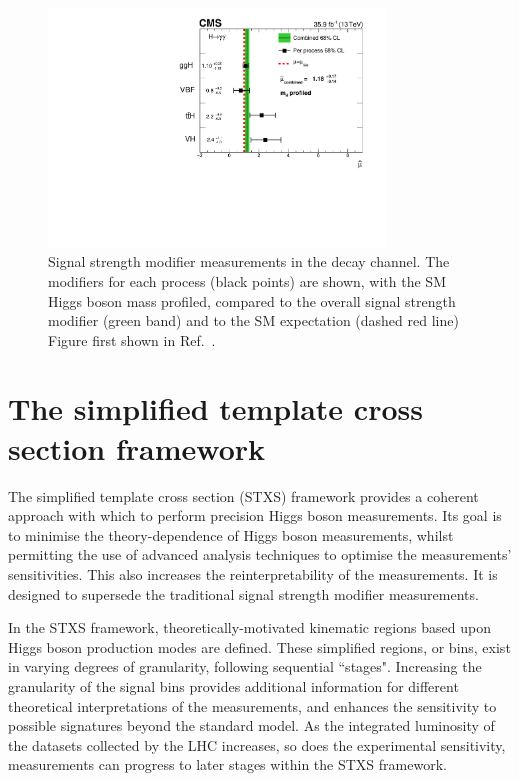 \begin{figure}[hptb]
  \centering
  \includegraphics[width=0.8\textwidth]{Figures/Theory/PerProcTrad.pdf}
  \caption[Per process signal strength modifier measurements from Ref.~\cite{HIG-16-040}.]
  {
    Signal strength modifier measurements in the \Hgg decay channel.
    The modifiers for each process (black points) are shown, with the SM Higgs boson mass profiled, 
    compared to the overall signal strength modifier (green band) 
    and to the SM expectation (dashed red line)
    Figure first shown in Ref.~\cite{HIG-16-040}.
  }
  \label{fig:theory_PerProcTrad}
\end{figure}

\section{The simplified template cross section framework}

The simplified template cross section (STXS) framework \cite{YR4}
provides a coherent approach with which to perform precision Higgs boson measurements. 
Its goal is to minimise the theory-dependence of Higgs boson measurements, 
whilst permitting the use of advanced analysis techniques to optimise the measurements' sensitivities.
This also increases the reinterpretability of the measurements.
It is designed to supersede the traditional signal strength modifier measurements.

In the STXS framework, 
theoretically-motivated kinematic regions based upon Higgs boson production modes are defined.
These simplified regions, or bins, exist in varying degrees of granularity, 
following sequential ``stages".
Increasing the granularity of the signal bins 
provides additional information for different theoretical interpretations of the measurements, 
and enhances the sensitivity to possible signatures beyond the standard model.
As the integrated luminosity of the datasets collected by the LHC increases, 
so does the experimental sensitivity,
measurements can progress to later stages within the STXS framework.

